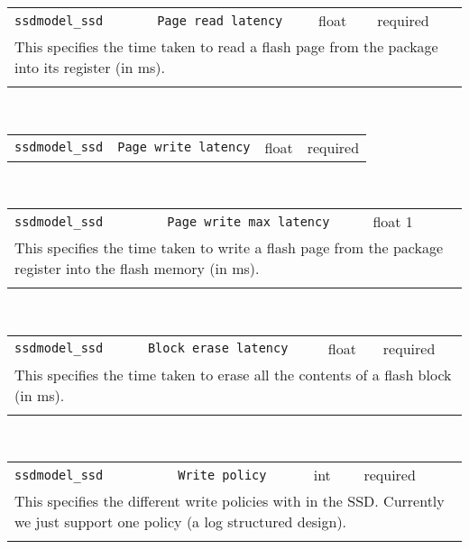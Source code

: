 \noindent 
\begin{tabular}{|p{\lpmodwidth}|p{\lpnamewidth}|p{0.5in}|p{0.5in}|}
\cline{1-4}
\texttt{ssdmodel\_ssd} & \texttt{Page read latency} & float & required \\ 
\cline{1-4}
\multicolumn{4}{|p{6in}|}{
This specifies the time taken to read a flash page from the package
into its register (in ms).
}\\ 
\cline{1-4}
\multicolumn{4}{p{5in}}{}\\
\end{tabular}\\ 
\noindent 
\begin{tabular}{|p{\lpmodwidth}|p{\lpnamewidth}|p{0.5in}|p{0.5in}|}
\cline{1-4}
\texttt{ssdmodel\_ssd} & \texttt{Page write latency} & float & required \\ 
\cline{1-4}
\end{tabular}\\ 
\noindent 
\begin{tabular}{|p{\lpmodwidth}|p{\lpnamewidth}|p{0.5in}|p{0.5in}|}
\cline{1-4}
\texttt{ssdmodel\_ssd} & \texttt{Page write max latency} & float 1 &  \\ 
\cline{1-4}
\multicolumn{4}{|p{6in}|}{
This specifies the time taken to write a flash page from the package
register into the flash memory (in ms).
}\\ 
\cline{1-4}
\multicolumn{4}{p{5in}}{}\\
\end{tabular}\\ 
\noindent 
\begin{tabular}{|p{\lpmodwidth}|p{\lpnamewidth}|p{0.5in}|p{0.5in}|}
\cline{1-4}
\texttt{ssdmodel\_ssd} & \texttt{Block erase latency} & float & required \\ 
\cline{1-4}
\multicolumn{4}{|p{6in}|}{
This specifies the time taken to erase all the contents of a flash
block (in ms).
}\\ 
\cline{1-4}
\multicolumn{4}{p{5in}}{}\\
\end{tabular}\\ 
\noindent 
\begin{tabular}{|p{\lpmodwidth}|p{\lpnamewidth}|p{0.5in}|p{0.5in}|}
\cline{1-4}
\texttt{ssdmodel\_ssd} & \texttt{Write policy} & int & required \\ 
\cline{1-4}
\multicolumn{4}{|p{6in}|}{
This specifies the different write policies with in the SSD. Currently
we just support one policy (a log structured design).
}\\ 
\cline{1-4}
\multicolumn{4}{p{5in}}{}\\
\end{tabular}\\ 
